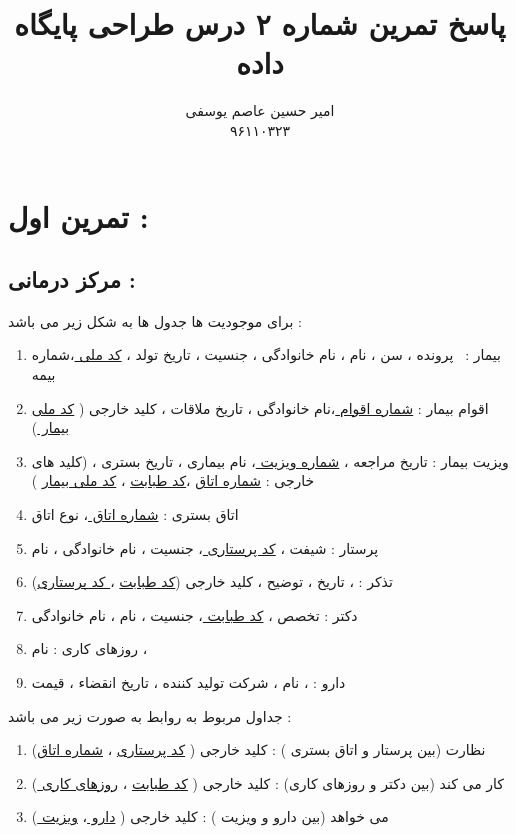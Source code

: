 \documentclass{article}
\title{پاسخ تمرین شماره ۲ درس طراحی پایگاه داده }
\author{امیر حسین عاصم یوسفی \\ ۹۶۱۱۰۳۲۳}
\begin{document}
	\maketitle
	
	\section*{تمرین اول : }
	\subsection*{مرکز درمانی : }
	برای موجودیت ها جدول ها به شکل زیر می باشد  :‌
	\begin{center}
		\begin{enumerate}
			\item بیمار  :  پرونده ، سن ، نام ، نام خانوادگی ، جنسیت ، تاریخ تولد ، 
			\underline{کد ملی }
			،شماره بیمه 
			\item  اقوام بیمار :‌
			\underline{شماره اقوام }
			،نام خانوادگی ، تاریخ  ملاقات ، 
			کلید خارجی (
	\underline{کد ملی بیمار })
	
			\item ویزیت بیمار : تاریخ مراجعه ، 
			\underline{شماره ویزیت }
			، نام بیماری ، تاریخ بستری ، 
			(کلید های خارجی  : \underline{شماره اتاق}  ،\underline{‌کد طبابت}  ، \underline{کد ملی بیمار} ) 

			\item اتاق بستری  : 
			\underline{شماره اتاق }
			، 
		نوع اتاق 
		\item پرستار : شیفت ، 
		\underline{کد پرستاری }
		، جنسیت ، نام خانوادگی ، نام 
		\item تذکر :
		\underline{ }
		، تاریخ ، توضیح ، کلید خارجی (\underline{کد طبابت}  ،\underline{ کد پرستاری})
		\item دکتر : تخصص ، 
		\underline{کد طبابت }
		، جنسیت ، نام ، نام خانوادگی 
		\item روزهای کاری  : نام ، 
		\underline{ }
		\item دارو  : 
		، نام ، شرکت تولید کننده ، تاریخ انقضاء ، قیمت 

	
		\end{enumerate}
	\end{center}
جداول مربوط به روابط به صورت زیر می باشد :
\begin{center}
	\begin{enumerate}
	
	\item نظارت 
	(بین پرستار و اتاق بستری ) :
	کلید خارجی ( 
	\underline{کد پرستاری}  ، \underline{شماره اتاق})
	

\item کار می کند  
(بین دکتر و روزهای کاری) : 
کلید خارجی (
\underline{کد طبابت} ،
\underline{
روزهای کاری })
\item می خواهد 
(بین دارو و ویزیت ) : 
کلید خارجی (
\underline{
دارو  }،
\underline{
 ویزیت })



	\end{enumerate}
\end{center}
\end{document}
